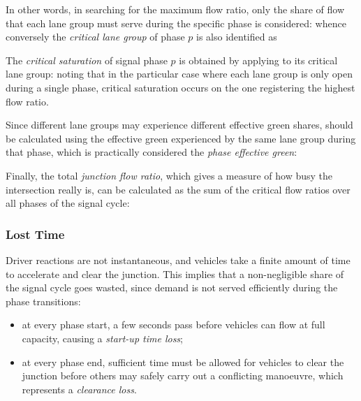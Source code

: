 In other words, in searching for the maximum flow ratio, only the share of flow that each lane group must serve during the specific phase is considered:
whence conversely the \emph{critical lane group} of phase $p$ is also identified as

The \emph{critical saturation} of signal phase $p$ is obtained by applying  to its critical lane group:
noting that in the particular case where each lane group is only open during a single phase, critical saturation occurs on the one registering the highest flow ratio.

Since different lane groups may experience different effective green shares, should be calculated using the effective green experienced by the same lane group during that phase, which is practically considered the \emph{phase effective green}:

Finally, the total \emph{junction flow ratio}, which gives a measure of how busy the intersection really is, can be calculated as the sum of the critical flow ratios over all phases of the signal cycle:


\subsubsection*{Lost Time}
Driver reactions are not instantaneous, and vehicles take a finite amount of time to
accelerate and clear the junction. This implies that a non-negligible share of the signal cycle goes wasted, since demand is not served efficiently during the phase transitions:
\begin{itemize}
\item at every phase start, a few seconds pass before vehicles can flow at full capacity, causing a \emph{start-up time loss};
\item at every phase end, sufficient time must be allowed for vehicles to clear the junction before others may safely carry out a conflicting manoeuvre, which represents a \emph{clearance loss}.
\end{itemize}

